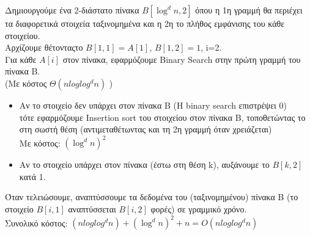 \documentclass[a4paper,10pt]{article} \usepackage{anysize}
\begin{document}
Δημιουργούμε ένα 2-διάστατο πίνακα $B[\log ^d {n},2]$ όπου η 1η γραμμή
θα περιέχει τα διαφορετικά στοιχεία ταξινομημένα και η 2η το πλήθος
εμφάνισης του κάθε στοιχείου.\\
Αρχίζουμε θέτονταςτο $B[1,1] = A[1]$, $B[1,2] = 1$, i=2.\\
Για κάθε $A[i]$ στον πίνακα, εφαρμόζουμε Binary Search στην πρώτη γραμμή του
πίνακα Β. \\
(Με κόστος $\Theta (n log{log^d{n}})$ )
\begin{itemize}
\item Αν το στοιχείο δεν υπάρχει στον πίνακα B (H binary search επιστρέψει 0)\\
τότε εφαρμόζουμε Insertion sort του στοιχείου στον πίνακα Β, τοποθετώντας το
στη σωστή θέση
(αντιμεταθέτωντας και τη 2η γραμμή όταν χρειάζεται)\\
Με κόστος: $(\log ^d{n})^2$
\item Αν το στοιχείο υπάρχει στον πίνακα (έστω στη θέση k), αυξάνουμε το
$B[k,2]$ κατά 1.
\end{itemize}
Όταν τελειώσουμε, αναπτύσσουμε τα δεδομένα του (ταξινομημένου) πίνακα Β (το στοιχείο $B[i,1]$
αναπτύσσεται $B[i,2]$ φορές) σε γραμμικό χρόνο.\\

Συνολικό κόστος: $(n log{log^d{n}}) + (\log ^d{n})^2 + n =  O(n log{log^d{n}}) $


\end{document}
